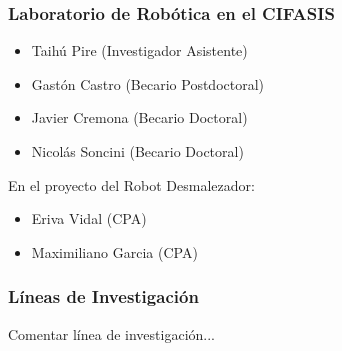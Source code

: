 \begin{frame}
    \frametitle{Laboratorio de Robótica en el CIFASIS}
      
    \begin{itemize}
        \item Taihú Pire (Investigador Asistente)
        \item Gastón Castro (Becario Postdoctoral)
        \item Javier Cremona (Becario Doctoral)
        \item Nicolás Soncini (Becario Doctoral)
    \end{itemize}
    
    En el proyecto del Robot Desmalezador:
    
    \begin{itemize}
        \item Eriva Vidal (CPA)
        \item Maximiliano Garcia (CPA)    
    \end{itemize}
    
\end{frame}


\begin{frame}
    \frametitle{Líneas de Investigación}
    
    Comentar línea de investigación...

\end{frame}


